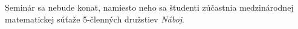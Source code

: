 
Seminár sa nebude konať, namiesto neho sa študenti zúčastnia medzinárodnej matematickej súťaže 5-členných družstiev \textit{Náboj}.


